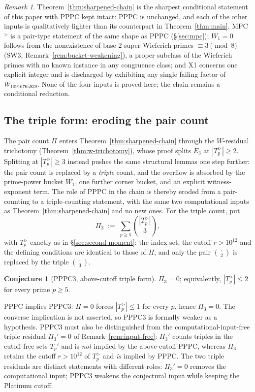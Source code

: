 \documentclass[11pt]{amsart}
\theoremstyle{plain}
\theoremstyle{definition}
\newtheorem{conjecture}[theorem]{Conjecture}
\theoremstyle{remark}
\newtheorem{remark}[theorem]{Remark}
\numberwithin{equation}{section}
\begin{document}
\begin{remark}\label{rem:sharpened-status}
Theorem~\ref{thm:sharpened-chain} is the sharpest conditional statement of this paper with PPPC kept intact: PPPC is unchanged, and each of the other inputs is qualitatively lighter than its counterpart in Theorem~\ref{thm:main}. MPC$^{>}$ is a pair-type statement of the same shape as PPPC (\S\ref{sec:mpc}); $W_1 = 0$ follows from the nonexistence of base-$2$ super-Wieferich primes $\equiv 3 \pmod 8$ (SW3, Remark~\ref{rem:bucket-weakening}), a proper subclass of the Wieferich primes with no known instance in any congruence class; and X1 concerns one explicit integer and is discharged by exhibiting any single failing factor of $W_{10916765939}$. None of the four inputs is proved here; the chain remains a conditional reduction.
\end{remark}

\subsection{The triple form: eroding the pair count}\label{sec:triple-form}

The pair count $\Pi$ enters Theorem~\ref{thm:sharpened-chain} through the $W$-residual trichotomy (Theorem~\ref{thm:w-trichotomy}), whose proof splits $E_3$ at $|T_p^{>}| \geq 2$. Splitting at $|T_p^{>}| \geq 3$ instead pushes the same structural lemmas one step further: the pair count is replaced by a \emph{triple} count, and the overflow is absorbed by the prime-power bucket $W_1$, one further corner bucket, and an explicit witness-exponent term. The role of PPPC in the chain is thereby eroded from a pair-counting to a triple-counting statement, with the same two computational inputs as Theorem~\ref{thm:sharpened-chain} and no new ones. For the triple count, put
\[
  \Pi_3 \;:=\; \sum_{p \geq 5} \binom{|T_p^{>}|}{3},
\]
with $T_p^{>}$ exactly as in \S\ref{sec:second-moment}: the index set, the cutoff $r > 10^{12}$ and the defining conditions are identical to those of $\Pi$, and only the pair $\binom{\,\cdot\,}{2}$ is replaced by the triple $\binom{\,\cdot\,}{3}$.

\begin{conjecture}[PPPC3, above-cutoff triple form]\label{conj:pppc3}
$\Pi_3 = 0$; equivalently, $|T_p^{>}| \leq 2$ for every prime $p \geq 5$.
\end{conjecture}

PPPC implies PPPC3: $\Pi = 0$ forces $|T_p^{>}| \leq 1$ for every $p$, hence $\Pi_3 = 0$. The converse implication is not asserted, so PPPC3 is formally weaker as a hypothesis. PPPC3 must also be distinguished from the computational-input-free triple residual $\Pi_3' = 0$ of Remark~\ref{rem:input-free}: $\Pi_3'$ counts triples in the cutoff-free sets $T_p'$ and is \emph{not} implied by the above-cutoff PPPC, whereas $\Pi_3$ retains the cutoff $r > 10^{12}$ of $T_p^{>}$ and \emph{is} implied by PPPC. The two triple residuals are distinct statements with different roles: $\Pi_3' = 0$ removes the computational input; PPPC3 weakens the conjectural input while keeping the Platinum cutoff.
\end{document}
